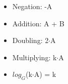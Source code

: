 \begin{itemize}
  \item Negation: -A
  \item Addition: A + B
  \item Doubling: 2$\cdot$A
  \item Multiplying: k$\cdot$A
  \item $log_{G}$(k$\cdot$A) = k
\end{itemize}
